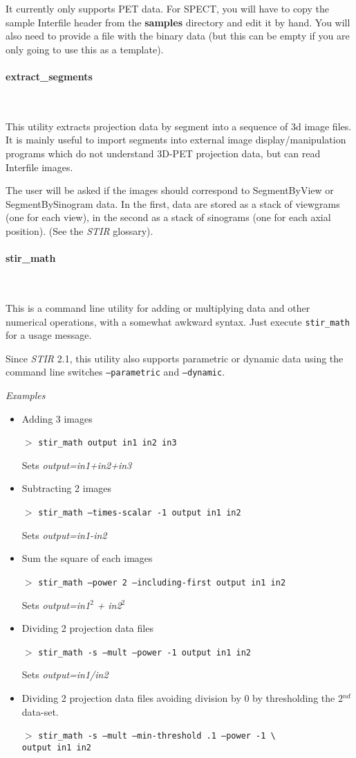 \documentclass{article}
\newcommand{\subsubsubsection}[1]{\paragraph{#1}\mbox{} \\}
\newcommand{\cmdline}[1]{\par \noindent $>$ \texttt{#1}\par}
\begin{document}
{It currently only supports PET data. For SPECT, you will have to copy the
sample Interfile header from the \textbf{samples} directory and edit it by hand.
You will also need to provide a file with the binary data (but this can be empty if
you are only going to use this as a template).

{ \subsubsubsection{extract\_segments}
}

This utility extracts projection data by segment into a sequence 
of 3d image files. It is mainly useful to import segments into 
external image display/manipulation programs which do not understand 
3D-PET projection data, but can read Interfile images.


The user will be asked if the images should correspond to SegmentByView 
or SegmentBySinogram data. In the first, data are stored as a 
stack of viewgrams (one for each view), in the second as a stack 
of sinograms (one for each axial position). (See the \textit{STIR} glossary).

{ \subsubsubsection{stir\_math}
}
\label{sec:stir_math}

This is a command line utility for adding or multiplying data 
and other numerical operations, with a somewhat awkward syntax. 
Just execute \texttt{stir\_math} for a usage message.

Since \textit{STIR} 2.1, this utility also supports parametric or dynamic data using
the command line switches \texttt{--parametric} and \texttt{--dynamic}.

\textit{Examples}
\begin{itemize}
\item
Adding 3 images
\cmdline{stir\_math output in1 in2 in3}

Sets \textit{output=in1+in2+in3}\\
\item
Subtracting 2 images
\cmdline{stir\_math --times-scalar -1 output in1 in2}


Sets \textit{output=in1-in2}\\
\item
Sum the square of each images
\cmdline{stir\_math --power 2 --including-first output in1 in2}


Sets \textit{output=in1}$^{\mathit{2}}$ \textit{+ in2}$^{\mathit{2}}$\\
\item
Dividing 2 projection data files
\cmdline{stir\_math -s --mult --power -1 output in1 in2}


Sets \textit{output=in1/in2}\\
\item
Dividing 2 projection data files avoiding division by 0 by thresholding 
the 2$^{nd}$ data-set.
\cmdline{stir\_math -s --mult --min-threshold .1 --power -1 {\textbackslash}\\
output in1 in2}



\end{itemize}}
\end{document}
